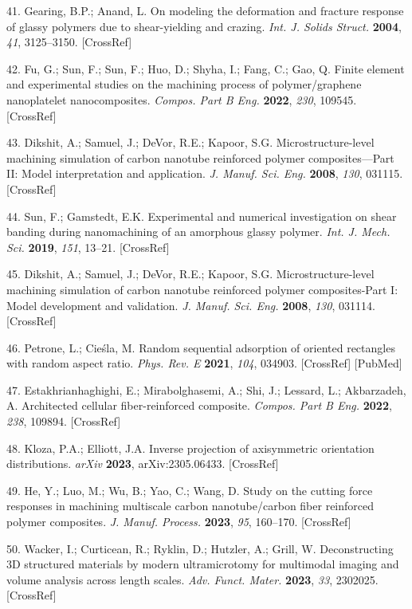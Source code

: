 \documentclass{article}
\begin{document}
\begin{hangpars}
41. Gearing, B.P.; Anand, L. On modeling the deformation and fracture response of glassy polymers due to shear-yielding and crazing. \emph{Int. J. Solids Struct.} \textbf{2004}, \emph{41}, 3125–3150. [CrossRef]

42. Fu, G.; Sun, F.; Sun, F.; Huo, D.; Shyha, I.; Fang, C.; Gao, Q. Finite element and experimental studies on the machining process of polymer/graphene nanoplatelet nanocomposites. \emph{Compos. Part B Eng.} \textbf{2022}, \emph{230}, 109545. [CrossRef]

43. Dikshit, A.; Samuel, J.; DeVor, R.E.; Kapoor, S.G. Microstructure-level machining simulation of carbon nanotube reinforced polymer composites—Part II: Model interpretation and application. \emph{J. Manuf. Sci. Eng.} \textbf{2008}, \emph{130}, 031115. [CrossRef]

44. Sun, F.; Gamstedt, E.K. Experimental and numerical investigation on shear banding during nanomachining of an amorphous glassy polymer. \emph{Int. J. Mech. Sci.} \textbf{2019}, \emph{151}, 13–21. [CrossRef]

45. Dikshit, A.; Samuel, J.; DeVor, R.E.; Kapoor, S.G. Microstructure-level machining simulation of carbon nanotube reinforced polymer composites-Part I: Model development and validation. \emph{J. Manuf. Sci. Eng.} \textbf{2008}, \emph{130}, 031114. [CrossRef]

46. Petrone, L.; Cieśla, M. Random sequential adsorption of oriented rectangles with random aspect ratio. \emph{Phys. Rev. E} \textbf{2021}, \emph{104}, 034903. [CrossRef] [PubMed]

47. Estakhrianhaghighi, E.; Mirabolghasemi, A.; Shi, J.; Lessard, L.; Akbarzadeh, A. Architected cellular fiber-reinforced composite. \emph{Compos. Part B Eng.} \textbf{2022}, \emph{238}, 109894. [CrossRef]

48. Kloza, P.A.; Elliott, J.A. Inverse projection of axisymmetric orientation distributions. \emph{arXiv} \textbf{2023}, arXiv:2305.06433. [CrossRef]

49. He, Y.; Luo, M.; Wu, B.; Yao, C.; Wang, D. Study on the cutting force responses in machining multiscale carbon nanotube/carbon fiber reinforced polymer composites. \emph{J. Manuf. Process.} \textbf{2023}, \emph{95}, 160–170. [CrossRef]

50. Wacker, I.; Curticean, R.; Ryklin, D.; Hutzler, A.; Grill, W. Deconstructing 3D structured materials by modern ultramicrotomy for multimodal imaging and volume analysis across length scales. \emph{Adv. Funct. Mater.} \textbf{2023}, \emph{33}, 2302025. [CrossRef]


\end{hangpars}
\end{document}
